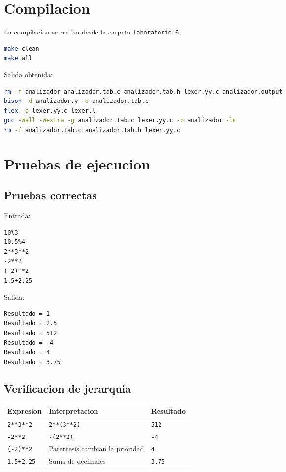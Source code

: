 \documentclass[12pt,a4paper]{article}
\begin{document}
\section{Compilacion}

La compilacion se realiza desde la carpeta \texttt{laboratorio-6}.

\begin{lstlisting}[language=bash]
make clean
make all
\end{lstlisting}

Salida obtenida:

\begin{lstlisting}[language=bash]
rm -f analizador analizador.tab.c analizador.tab.h lexer.yy.c analizador.output
bison -d analizador.y -o analizador.tab.c
flex -o lexer.yy.c lexer.l
gcc -Wall -Wextra -g analizador.tab.c lexer.yy.c -o analizador -lm
rm -f analizador.tab.c analizador.tab.h lexer.yy.c
\end{lstlisting}

\section{Pruebas de ejecucion}

\subsection{Pruebas correctas}

Entrada:

\begin{lstlisting}
10%3
10.5%4
2**3**2
-2**2
(-2)**2
1.5+2.25
\end{lstlisting}

Salida:

\begin{lstlisting}
Resultado = 1
Resultado = 2.5
Resultado = 512
Resultado = -4
Resultado = 4
Resultado = 3.75
\end{lstlisting}

\subsection{Verificacion de jerarquia}

\begin{longtable}{|p{4cm}|p{6cm}|p{3cm}|}
\hline
\textbf{Expresion} & \textbf{Interpretacion} & \textbf{Resultado} \\
\hline
\texttt{2**3**2} & \texttt{2**(3**2)} & \texttt{512} \\
\hline
\texttt{-2**2} & \texttt{-(2**2)} & \texttt{-4} \\
\hline
\texttt{(-2)**2} & Parentesis cambian la prioridad & \texttt{4} \\
\hline
\texttt{1.5+2.25} & Suma de decimales & \texttt{3.75} \\
\hline
\end{longtable}
\end{document}
